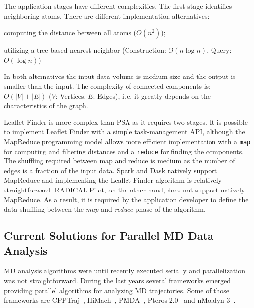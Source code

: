 The application stages have different complexities.
The first stage identifies neighboring atoms.
There are different implementation alternatives: 
\begin{inparaenum}[i)]
    \item computing the distance between all atoms ($O(n^2)$);
    \item utilizing a tree-based nearest neighbor (Construction: $O(n\log n)$, 
    Query: $O(\log n)$).
\end{inparaenum}
In both alternatives the input data volume is medium size and the output is smaller than the input.
The complexity of connected components is: $O(|V|+|E|)$ ($V$: Vertices, $E$: Edges), i.\,e. it greatly depends on the characteristics of the graph.

Leaflet Finder is more complex than PSA as it requires two stages.
It is possible to implement Leaflet Finder with a simple task-management API, although the MapReduce programming model allows more efficient implementation with a \texttt{map} for computing and filtering distances and a \texttt{reduce} for finding the components.
The shuffling required between map and reduce is medium as the number of edges is a fraction of the input data.
Spark and Dask natively support MapReduce and implementing the Leaflet Finder algorithm is relatively straightforward.
RADICAL-Pilot, on the other hand, does not support natively MapReduce.
As a result, it is required by the application developer to define the data shuffling between the \emph{map} and \emph{reduce} phase of the algorithm.

\subsection{Current Solutions for Parallel MD Data Analysis}
\label{ssec:related_work}
MD analysis algorithms were until recently executed serially and parallelization was not straightforward.
During the last years several frameworks emerged providing parallel algorithms for analyzing MD trajectories.
Some of those frameworks are CPPTraj~\cite{roe2013ptraj,roe2018parallelization}, HiMach~\cite{tiankai2008scalable}, PMDA~\cite{fan2019pmda}, Pteros 2.0~\cite{yesylevskyy2015pteros} and nMoldyn-3~\cite{hinsen2012nmoldyn}.

